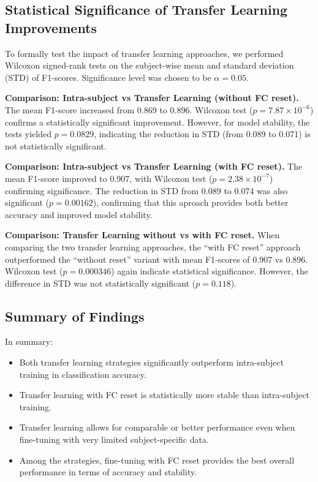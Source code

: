 \begin{multicols}{2}

\subsection*{Statistical Significance of Transfer Learning Improvements}

To formally test the impact of transfer learning approaches, we performed Wilcoxon signed-rank tests on the subject-wise mean and standard deviation (STD) of F1-scores.
Significance level was chosen to be $\alpha = 0.05$.

\textbf{Comparison: Intra-subject vs Transfer Learning (without FC reset).}  
The mean F1-score increased from 0.869 to 0.896. Wilcoxon test ($p = 7.87 \times 10^{-6}$) confirms a statistically significant improvement. However, for model stability, the tests yielded $p = 0.0829$, indicating the reduction in STD (from 0.089 to 0.071) is not statistically significant.

\textbf{Comparison: Intra-subject vs Transfer Learning (with FC reset).}  
The mean F1-score improved to 0.907, with Wilcoxon test ($p = 2.38 \times 10^{-7}$) confirming significance. The reduction in STD from 0.089 to 0.074 was also significant ($p = 0.00162$), confirming that this aproach provides both better accuracy and improved model stability.

\textbf{Comparison: Transfer Learning without vs with FC reset.}  
When comparing the two transfer learning approaches, the ``with FC reset'' approach outperformed the ``without reset'' variant with mean F1-scores of 0.907 vs 0.896. Wilcoxon test ($p = 0.000346$) again indicate statistical significance. However, the difference in STD was not statistically significant ($p = 0.118$).


\subsection*{Summary of Findings}

In summary:
\begin{itemize}
    \item Both transfer learning strategies significantly outperform intra-subject training in classification accuracy.
    \item Transfer learning with FC reset is statistically more stable than intra-subject training.
    \item Transfer learning allows for comparable or better performance even when fine-tuning with very limited subject-specific data.
    \item Among the strategies, fine-tuning with FC reset provides the best overall performance in terms of accuracy and stability.
\end{itemize}


\end{multicols}
